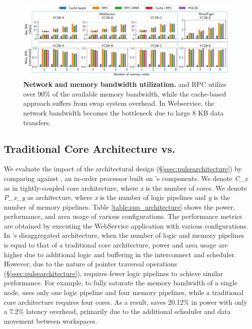 \begin{figure}[t]
\centering
  \includegraphics[width=\textwidth]{fig/pulse/network_memory.pdf}
  \caption[Network and memory bandwidth utilization]{\textbf{Network and memory bandwidth utilization.} \pulse and RPC utilize over 90\% of the available memory bandwidth, while the cache-based approach suffers from swap system overhead. In Webservice, the network bandwidth becomes the bottleneck due to large 8 KB data transfers.}
\label{fig:sup_eval_perf_e2e_utilization}
\end{figure}

\subsection{Traditional Core Architecture vs. \pulse} 
We evaluate the impact of the \pulse architectural design (\S\ref{ssec:pulsearchitecture}) by comparing \pulse against \pulsearch, an in-order processor built on \pulse's components. We denote \textit{C\_x} as in tightly-coupled core architecture, where \textit{x} is the number of cores. We denote \textit{P\_x\_y} as \pulse architecture, where \textit{x} is the number of logic pipelines and \textit{y} is the number of memory pipelines. Table \ref{table:sup_architecture} shows the power, performance, and area usage of various configurations. The performance metrics are obtained by executing the WebService application with various configurations. In \pulse's disaggregated architecture, when the number of logic and memory pipelines is equal to that of a traditional core architecture, power and area usage are higher due to additional logic and buffering in the interconnect and scheduler. However, due to the nature of pointer traversal operations (\S\ref{ssec:pulsearchitecture}), \pulse requires fewer logic pipelines to achieve similar performance. For example, to fully saturate the memory bandwidth of a single node, \pulse uses only one logic pipeline and four memory pipelines, while a traditional core architecture requires four cores. As a result, \pulse saves 20.12\% in power with only a 7.2\% latency overhead, primarily due to the additional scheduler and data movement between workspaces.

